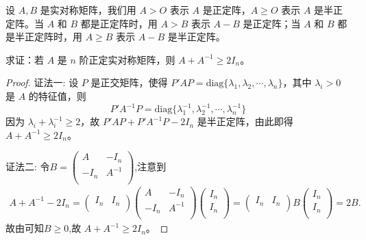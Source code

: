 \documentclass[../../main.tex]{subfiles}
\begin{document}
\begin{definition}[正定阵和半正定阵的记号]
设 \(A,B\) 是实对称矩阵，我们用 \(A > O\) 表示 \(A\) 是正定阵，\(A \geqslant  O\) 表示 \(A\) 是半正定阵。当 \(A\) 和 \(B\) 都是正定阵时，用 \(A > B\) 表示 \(A - B\) 是正定阵；当 \(A\) 和 \(B\) 都是半正定阵时，用 \(A \geqslant  B\) 表示 \(A - B\) 是半正定阵。 
\end{definition}

\begin{example}\label{proposition:例9.59}
求证：若 \(A\) 是 \(n\) 阶正定实对称矩阵，则 \(A + A^{-1} \geqslant  2I_n\)。
\end{example}
\begin{proof}
{\color{blue}证法一:}
设 \(P\) 是正交矩阵，使得 \(P'AP = \mathrm{diag}\{\lambda_1,\lambda_2,\cdots,\lambda_n\}\)，其中 \(\lambda_i > 0\) 是 \(A\) 的特征值，则
\[
P'A^{-1}P = \mathrm{diag}\{\lambda_1^{-1},\lambda_2^{-1},\cdots,\lambda_n^{-1}\}
\]
因为 \(\lambda_i + \lambda_i^{-1} \geqslant  2\)，故 \(P'AP + P'A^{-1}P - 2I_n\) 是半正定阵，由此即得 \(A + A^{-1} \geqslant  2I_n\)。

{\color{blue}证法二:}
令$B=\left( \begin{matrix}
A&		-I_n\\
-I_n&		A^{-1}\\
\end{matrix} \right) $,注意到
\begin{align*}
A+A^{-1}-2I_n=\left( \begin{matrix}
I_n&		I_n\\
\end{matrix} \right) \left( \begin{matrix}
A&		-I_n\\
-I_n&		A^{-1}\\
\end{matrix} \right) \left( \begin{array}{c}
I_n\\
I_n\\
\end{array} \right) =\left( \begin{matrix}
I_n&		I_n\\
\end{matrix} \right) B\left( \begin{array}{c}
I_n\\
I_n\\
\end{array} \right) =2B.
\end{align*}
故由可知$B\geqslant  0$,故 \(A + A^{-1} \geqslant  2I_n\)。 
\end{proof}
\end{document}

